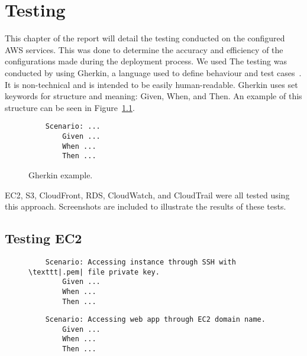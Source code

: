 \chapter{Testing}\label{ch:testing}

This chapter of the report will detail the testing conducted on the configured AWS services.
This was done to determine the accuracy and efficiency of the configurations made during the deployment process.
We used
The testing was conducted by using Gherkin, a language used to define behaviour and test
cases~\parencite{dos2018automated}.
It is non-technical and is intended to be easily human-readable.
Gherkin uses set keywords for structure and meaning: Given, When, and Then.
An example of this structure can be seen in Figure~\ref{fig:gherkin}.

\begin{figure}[!htbp]
    \centering
    \begin{verbatim}
    Scenario: ...
        Given ...
        When ...
        Then ...
    \end{verbatim}
    \caption{Gherkin example.}\label{fig:gherkin}
\end{figure}

EC2, S3, CloudFront, RDS, CloudWatch, and CloudTrail were all tested using this approach.
Screenshots are included to illustrate the results of these tests.

\section{Testing EC2}\label{sec:testing-ec2}

\begin{figure}[!htbp]
    \centering
    \begin{verbatim}
    Scenario: Accessing instance through SSH with \texttt|.pem| file private key.
        Given ...
        When ...
        Then ...
    \end{verbatim}
    \label{fig:accessing-instance-ec2}
\end{figure}

\begin{figure}[!htbp]
    \centering
    \begin{verbatim}
    Scenario: Accessing web app through EC2 domain name.
        Given ...
        When ...
        Then ...
    \end{verbatim}
    \label{fig:accessing-web-app-ec2}
\end{figure}

